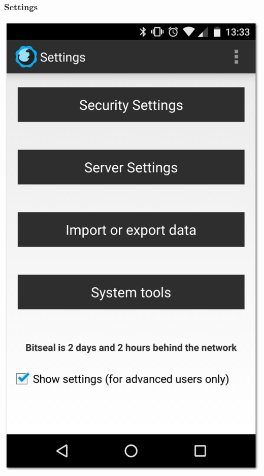 \documentclass{bfh}
\begin{document}
  \subsubsection{Settings}
  \begin{center}
    \begin{minipage}{.3\linewidth}
      \includegraphics[width=1.0 \textwidth]{images/screenshots/bitseal_settings.png}
    \end{minipage}
    \hspace{.03\linewidth}

\end{center}
\end{document}
